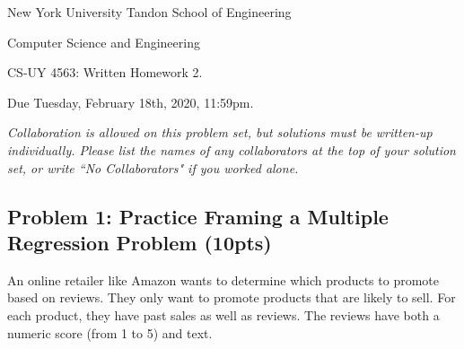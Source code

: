 \documentclass[10pt]{article}
\begin{document}
	
\begin{center}
	\normalsize
	New York University Tandon School of Engineering
	
	Computer Science and Engineering
	\medskip
	
	\large
	CS-UY 4563: Written Homework 2. 
	
	Due Tuesday, February 18th, 2020, 11:59pm.
	\medskip
	
	\normalsize 
	\noindent \emph{Collaboration is allowed on this problem set, but solutions must be written-up individually. Please list the names of any collaborators at the top of your solution set, or write ``No Collaborators" if you worked alone.}
	\medskip
\end{center} 

\subsection{Problem 1: Practice Framing a Multiple Regression Problem (10pts)}
 An online retailer like Amazon wants to determine which products to promote based on reviews. They only want to promote products that are likely to sell. For each product, they have past sales as well as reviews. The reviews have both a numeric score (from 1 to 5) and text.
 
\end{document}
